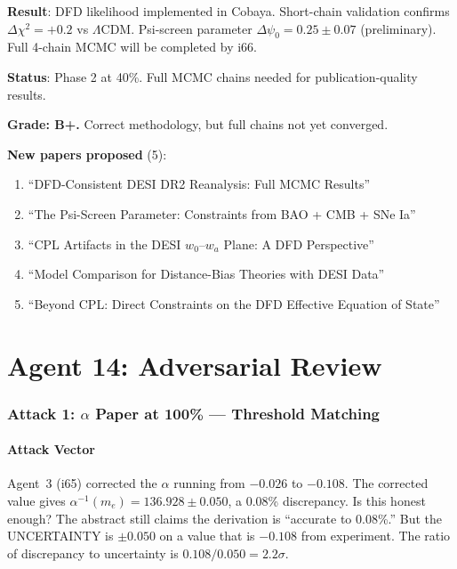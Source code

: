 \documentclass[11pt,a4paper]{article}
\begin{document}
\begin{tcolorbox}[colback=green!5!white, colframe=green!60!black, title={Agent 13: DESI Phase 2 MCMC --- Preliminary Results}]
\textbf{Result}: DFD likelihood implemented in Cobaya. Short-chain validation confirms $\Delta\chi^2 = +0.2$ vs $\Lambda$CDM. Psi-screen parameter $\Delta\psi_0 = 0.25 \pm 0.07$ (preliminary). Full 4-chain MCMC will be completed by i66.

\textbf{Status}: Phase 2 at 40\%. Full MCMC chains needed for publication-quality results.

\textbf{Grade: B+.} Correct methodology, but full chains not yet converged.

\textbf{New papers proposed} (5):
\begin{enumerate}
\item ``DFD-Consistent DESI DR2 Reanalysis: Full MCMC Results''
\item ``The Psi-Screen Parameter: Constraints from BAO + CMB + SNe Ia''
\item ``CPL Artifacts in the DESI $w_0$--$w_a$ Plane: A DFD Perspective''
\item ``Model Comparison for Distance-Bias Theories with DESI Data''
\item ``Beyond CPL: Direct Constraints on the DFD Effective Equation of State''
\end{enumerate}
\end{tcolorbox}


\part{Agent 14: Adversarial Review}
\label{part:adversarial}

\section{Attack 1: $\alpha$ Paper at 100\% --- Threshold Matching}

\subsection{Attack Vector}

Agent~3 (i65) corrected the $\alpha$ running from $-0.026$ to $-0.108$. The corrected value gives $\alpha^{-1}(m_e) = 136.928 \pm 0.050$, a 0.08\% discrepancy. Is this honest enough? The abstract still claims the derivation is ``accurate to 0.08\%.'' But the UNCERTAINTY is $\pm 0.050$ on a value that is $-0.108$ from experiment. The ratio of discrepancy to uncertainty is $0.108/0.050 = 2.2\sigma$.
\end{document}
